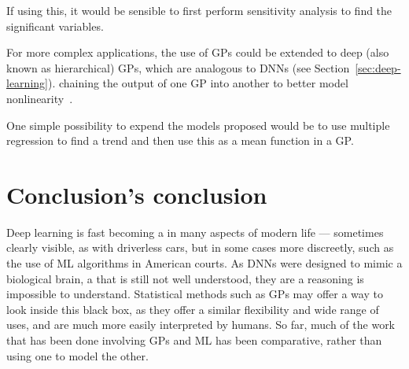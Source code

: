 If using this, it would be sensible to first perform sensitivity analysis to find the significant variables.

For more complex applications, the use of \acp{GP} could be extended to deep (also known as hierarchical) \acp{GP}, which are analogous to \acp{DNN} (see Section~\ref{sec:deep-learning}).
 chaining the output of one \ac{GP} into another to better model nonlinearity~\autocite{damianou2013}.

One simple possibility to expend the models proposed would be to use multiple regression to find a trend and then use this as a mean function in a \ac{GP}.

\section{Conclusion's conclusion}

Deep learning is fast becoming a  in many aspects of modern life --- sometimes clearly visible, as with driverless cars, but in some cases more discreetly, such as the use of \ac{ML} algorithms in American courts.
As \acp{DNN} were designed to mimic a biological brain, a  that is still not well understood, they are a   reasoning is impossible to understand.
Statistical methods such as \acp{GP} may offer a way to look inside this black box, as they offer a similar flexibility and wide range of uses, and are much more easily interpreted by humans.
So far, much of the work that has been done involving \acp{GP} and \ac{ML} has been comparative, rather than using one to model the other.
